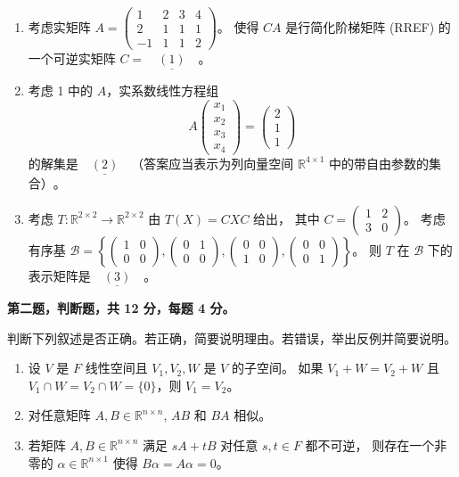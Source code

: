 \begin{enumerate}
  \item 考虑实矩阵 $A=\begin{pmatrix}1 & 2 & 3 & 4 \\ 2 & 1 & 1 & 1 \\ -1 & 1 & 1 & 2\end{pmatrix}$。
  使得 $C A$ 是行简化阶梯矩阵 (RREF) 的一个可逆实矩阵 $C=\underline{\quad(1)\quad} 。$

  \item 考虑 1 中的 $A$，实系数线性方程组
$$A\begin{pmatrix}x_{1} \\x_{2} \\x_{3} \\x_{4}\end{pmatrix}
=\begin{pmatrix}2 \\1 \\1\end{pmatrix}$$
的解集是$\underline{\quad(2)\quad} $（答案应当表示为列向量空间 $\mathbb{R}^{4 \times 1}$ 中的带自由参数的集合）$。$

\item 考虑 $T: \mathbb{R}^{2 \times 2} \rightarrow \mathbb{R}^{2 \times 2}$ 由 $T(X)=C X C$ 给出，
其中 $C=\begin{pmatrix}1 & 2 \\ 3 & 0\end{pmatrix}$。
考虑有序基 $\mathcal{B}=\left\{\begin{pmatrix}1 & 0 \\ 0 & 0\end{pmatrix},
\begin{pmatrix}0 & 1 \\ 0 & 0\end{pmatrix},
\begin{pmatrix}0 & 0 \\ 1 & 0\end{pmatrix},
\begin{pmatrix}0 & 0 \\ 0 & 1\end{pmatrix}\right\}$。
则 $T$ 在 $\mathcal{B}$ 下的表示矩阵是$\underline{\quad(3)\quad} 。$
\end{enumerate}

\textbf{第二题，判断题，共 12 分，每题 4 分。}

判断下列叙述是否正确。若正确，简要说明理由。若错误，举出反例并简要说明。

\begin{enumerate}
  \item 设 $V$ 是 $F$ 线性空间且 $V_{1}, V_{2}, W$ 是 $V$ 的子空间。
  如果 $V_{1}+W=V_{2}+W$ 且 $V_{1} \cap W=V_{2} \cap W=\{0\}$，则 $V_{1}=V_{2}$。
  \item 对任意矩阵 $A, B \in \mathbb{R}^{n \times n}$, $A B$ 和 $B A$ 相似。
  \item 若矩阵 $A, B \in \mathbb{R}^{n \times n}$ 满足 $s A+t B$ 对任意 $s, t \in F$ 都不可逆，
  则存在一个非零的 $\alpha \in \mathbb{R}^{n \times 1}$ 使得 $B \alpha=A \alpha=0$。
\end{enumerate}

